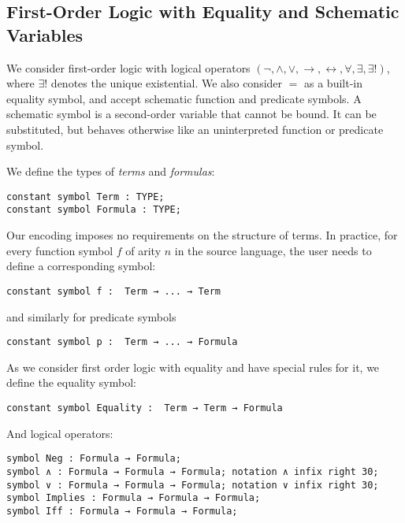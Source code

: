 \documentclass{article}
\begin{document}
\newpage	
	
	\subsection{First-Order Logic with Equality and Schematic Variables}
	We consider first-order logic with logical operators $(\neg, \land, \lor, \rightarrow, \leftrightarrow, \forall, \exists, \exists !)$, where $\exists !$ denotes the unique existential. We also consider $=$ as a built-in equality symbol, and accept schematic function and predicate symbols. A schematic symbol is a second-order variable that cannot be bound. It can be substituted, but behaves otherwise like an uninterpreted function or predicate symbol.
	
	We define the types of \textit{terms} and \textit{formulas}:

	\begin{lstlisting}[language=Dialekto]
constant symbol Term : TYPE;
constant symbol Formula : TYPE;
	\end{lstlisting}
	Our encoding imposes no requirements on the structure of terms. In practice,  for every function symbol $f$ of arity $n$ in the source language, the user needs to define a corresponding symbol:
	\begin{lstlisting}[language=Dialekto]
constant symbol f :  Term → ... → Term
	\end{lstlisting}
	and similarly for predicate symbols
	\begin{lstlisting}[language=Dialekto]
constant symbol p :  Term → ... → Formula
	\end{lstlisting}
	As we consider first order logic with equality and have special rules for it, we define the equality symbol:
	\begin{lstlisting}[language=Dialekto]
constant symbol Equality :  Term → Term → Formula
	\end{lstlisting}
	And logical operators:
	\begin{lstlisting}[language=Dialekto]
symbol Neg : Formula → Formula;
symbol ∧ : Formula → Formula → Formula; notation ∧ infix right 30;
symbol ∨ : Formula → Formula → Formula; notation ∨ infix right 30;
symbol Implies : Formula → Formula → Formula;
symbol Iff : Formula → Formula → Formula;
\end{lstlisting}
\end{document}
